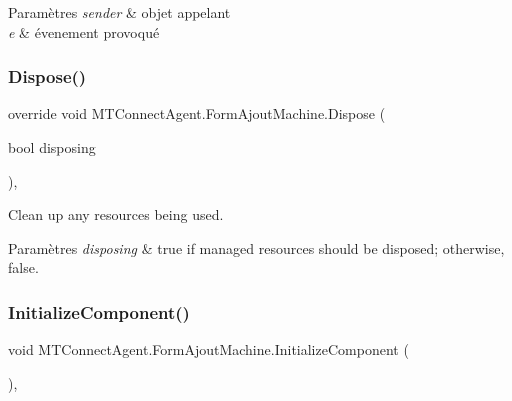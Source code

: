 \begin{DoxyParams}{Paramètres}
{\em sender} & objet appelant\\
\hline
{\em e} & évenement provoqué\\
\hline
\end{DoxyParams}
\mbox{\label{class_m_t_connect_agent_1_1_form_ajout_machine_a281c5466b5ca2d5daea6fc4280955969}} 
\subsubsection{\texorpdfstring{Dispose()}{Dispose()}}
{\footnotesize\ttfamily override void M\+T\+Connect\+Agent.\+Form\+Ajout\+Machine.\+Dispose (\begin{DoxyParamCaption}\item[{bool}]{disposing }\end{DoxyParamCaption})\hspace{0.3cm}{\ttfamily [inline]}, {\ttfamily [protected]}}



Clean up any resources being used. 


\begin{DoxyParams}{Paramètres}
{\em disposing} & true if managed resources should be disposed; otherwise, false.\\
\hline
\end{DoxyParams}
\mbox{\label{class_m_t_connect_agent_1_1_form_ajout_machine_a936b4b500ded91215c0ed272b98b94be}} 
\subsubsection{\texorpdfstring{Initialize\+Component()}{InitializeComponent()}}
{\footnotesize\ttfamily void M\+T\+Connect\+Agent.\+Form\+Ajout\+Machine.\+Initialize\+Component (\begin{DoxyParamCaption}{ }\end{DoxyParamCaption})\hspace{0.3cm}{\ttfamily [inline]}, {\ttfamily [private]}}



